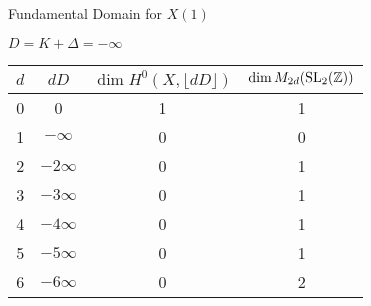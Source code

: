 \begin{frame}{Fundamental Domain for $X(1)$}


  \begin{center}
    $D = K + \Delta = -\infty$
  \end{center}


\begin{center}
\begin{tabular}{ |c| c| c| c|}
\hline
$d$ & $dD$ &  $\dim H^0(X,\lfloor dD \rfloor)$  & $\dim M_{2d}(\operatorname{SL}_2(\mathbb{Z}))$  \\ 
\hline
0& 0&  1& 1 \\ 
1&$-\infty$& 0&  0 \\  
2&$-2\infty$& 0&  1  \\
3&$-3\infty$& 0&  1  \\
4&$-4\infty$& 0&  1  \\
5&$-5\infty$& 0&  1  \\
6&$-6\infty$& 0& 2   \\
\hline
\end{tabular}
\end{center}


\end{frame}
